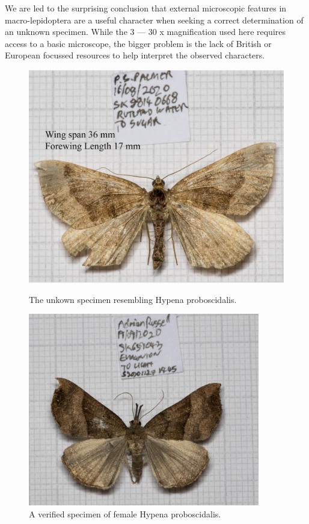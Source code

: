 \documentclass[]{article}
\begin{document}
We are led to the surprising conclusion that external microscopic features in macro-lepidoptera are a useful character when seeking a correct determination of an unknown specimen. While the  3 --- 30 x magnification used here requires access to a basic microscope, the bigger problem is the lack of British or European focussed resources to help interpret the observed characters.


\begin{figure}
	\centering
	\begin{minipage}{0.45\textwidth}
		\centering
	\includegraphics[width=0.9\linewidth]{202009131026PJP-annotated}
	\caption{The unkown specimen resembling Hypena proboscidalis.}
	\label{fig:202009131026pjp-1}
	\end{minipage}\hfill
	\begin{minipage}{0.45\textwidth}
		\centering
		\includegraphics[width=0.9\textwidth]{S202012271445-1} %
		\caption{A verified specimen of female Hypena proboscidalis.}
		\label{fig:S202012271446-1}
	\end{minipage}
\end{figure}
\end{document}
